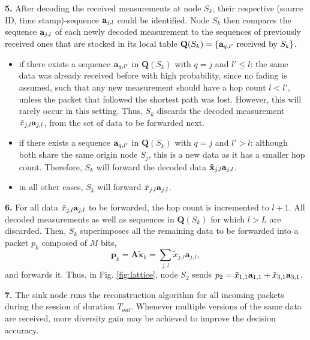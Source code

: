 \documentclass[letterpaper,conference]{IEEEtran}
\begin{document}
\noindent \textbf{5.} After decoding the received measurements at node $S_k$, their respective (source ID, time stamp)-sequence $\mbox{\bf a}_{j,l}$ could be identified.
Node $S_k$ then compares the sequence $\mbox{\bf a}_{j,l}$ of each newly decoded measurement to the sequences of previously received ones that are stocked in its local table $\mathbf{Q}(S_k)=\{\mbox{\bf a}_{q,l'} \ \text{received by} \ S_k\}$.
      \begin{itemize}
        \item if there exists a sequence $\mbox{\bf a}_{q,l'}$ in $\mathbf{Q}(S_k)$ with $q=j$ and $l' \leq l$: the same data was already received before with high probability, since no fading is assumed, such that any new measurement should have a hop count $l < l'$, unless the packet that followed the shortest path was lost. However, this will rarely occur in this setting. Thus, $S_k$ discards the decoded measurement $\tilde{x}_{j,l}\mbox{\bf a}_{j,l}$, from the set of data to be forwarded next.
        \item if there exists a sequence $\mbox{\bf a}_{q,l'}$ in $\mathbf{Q}(S_k)$ with $q=j$ and $l'>l$: although both share the same origin node $S_j$, this is a new data as it has a smaller hop count. Therefore, $S_k$ will forward the decoded data $\mathbf{\tilde{x}}_{j,l}\mbox{\bf a}_{j,l}$.
        \item in all other cases, $S_k$ will forward $\tilde{x}_{j,l}\mbox{\bf a}_{j,l}$.
      \end{itemize}

\noindent \textbf{6.} For all data $\tilde{x}_{j,l}\mbox{\bf a}_{j,l}$ to be forwarded, the hop count is incremented to $l+1$.
All decoded measurements as well as sequences in $\mathbf{Q}(S_k)$ for which $l>L$ are discarded.
Then, $S_k$ superimposes all the remaining data to be forwarded into a packet $p_{k}$ composed of $M$ bits,
\begin{equation}
    \mathbf{p}_k=\mathbf{A}\mathbf{\tilde{x}}_k=\sum_{j,l}\tilde{x}_{j,l}\mathbf{a}_{j,l},
\end{equation}
and forwards it. Thus, in Fig. \ref{fig:lattice}, node $S_2$ sends $p_2=\tilde{x}_{1,1}\mbox{\bf a}_{1,1}+\tilde{x}_{3,1}\mbox{\bf a}_{3,1}$.

\noindent \textbf{7.} The sink node runs the reconstruction algorithm for all incoming packets during the session of duration $T_{out}$. Whenever multiple versions of the same data are received, more diversity gain may be achieved to improve the decision accuracy.
\end{document}
